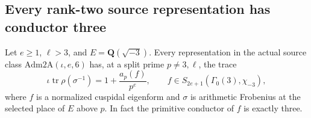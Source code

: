 \subsection{Every rank-two source representation has conductor three}
\label{sec:gl2-conductor}

\begin{lemma}[K17-GL2-CONDUCTOR]\label{lem:gl2-conductor}
Let $e\geq1$, $\ell>3$, and $E=\mathbf Q(\sqrt{-3})$.
Every representation in the actual source class
$\mathrm{Adm2A}(\iota,e,6)$ has, at a split prime $p\ne3,\ell$,
the trace
\[
 \iota\operatorname{tr}\rho(\sigma^{-1})
       =1+\frac{a_p(f)}{p^e},
 \qquad
 f\in S_{2e+1}(\Gamma_0(3),\chi_{-3}),
\]
where $f$ is a normalized cuspidal eigenform and $\sigma$ is arithmetic
Frobenius at the selected place of $E$ above $p$.
In fact the primitive conductor of $f$ is exactly three.
\end{lemma}


